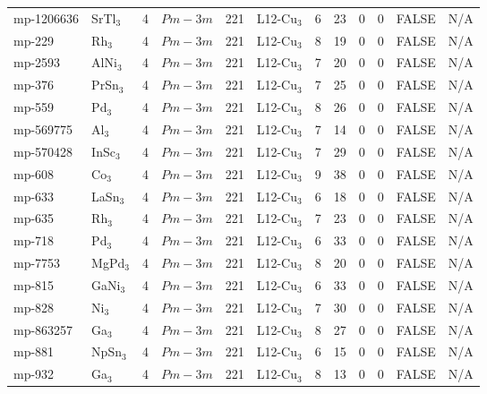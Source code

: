 {\begin{longtable}{llcccccccccc}
    mp-1206636 & SrTl$_{3}$ & 4     & $Pm-3m$ & 221   & L12-Cu$_{3}$ & 6     & 23    & 0     & 0     & FALSE & N/A \\
    mp-229 & Rh$_{3}$ & 4     & $Pm-3m$ & 221   & L12-Cu$_{3}$ & 8     & 19    & 0     & 0     & FALSE & N/A \\
    mp-2593 & AlNi$_{3}$ & 4     & $Pm-3m$ & 221   & L12-Cu$_{3}$ & 7     & 20    & 0     & 0     & FALSE & N/A \\
    mp-376 & PrSn$_{3}$ & 4     & $Pm-3m$ & 221   & L12-Cu$_{3}$ & 7     & 25    & 0     & 0     & FALSE & N/A \\
    mp-559 & Pd$_{3}$ & 4     & $Pm-3m$ & 221   & L12-Cu$_{3}$ & 8     & 26    & 0     & 0     & FALSE & N/A \\
    mp-569775 & Al$_{3}$ & 4     & $Pm-3m$ & 221   & L12-Cu$_{3}$ & 7     & 14    & 0     & 0     & FALSE & N/A \\
    mp-570428 & InSc$_{3}$ & 4     & $Pm-3m$ & 221   & L12-Cu$_{3}$ & 7     & 29    & 0     & 0     & FALSE & N/A \\
    mp-608 & Co$_{3}$ & 4     & $Pm-3m$ & 221   & L12-Cu$_{3}$ & 9     & 38    & 0     & 0     & FALSE & N/A \\
    mp-633 & LaSn$_{3}$ & 4     & $Pm-3m$ & 221   & L12-Cu$_{3}$ & 6     & 18    & 0     & 0     & FALSE & N/A \\
    mp-635 & Rh$_{3}$ & 4     & $Pm-3m$ & 221   & L12-Cu$_{3}$ & 7     & 23    & 0     & 0     & FALSE & N/A \\
    mp-718 & Pd$_{3}$ & 4     & $Pm-3m$ & 221   & L12-Cu$_{3}$ & 6     & 33    & 0     & 0     & FALSE & N/A \\
    mp-7753 & MgPd$_{3}$ & 4     & $Pm-3m$ & 221   & L12-Cu$_{3}$ & 8     & 20    & 0     & 0     & FALSE & N/A \\
    mp-815 & GaNi$_{3}$ & 4     & $Pm-3m$ & 221   & L12-Cu$_{3}$ & 6     & 33    & 0     & 0     & FALSE & N/A \\
    mp-828 & Ni$_{3}$ & 4     & $Pm-3m$ & 221   & L12-Cu$_{3}$ & 7     & 30    & 0     & 0     & FALSE & N/A \\
    mp-863257 & Ga$_{3}$ & 4     & $Pm-3m$ & 221   & L12-Cu$_{3}$ & 8     & 27    & 0     & 0     & FALSE & N/A \\
    mp-881 & NpSn$_{3}$ & 4     & $Pm-3m$ & 221   & L12-Cu$_{3}$ & 6     & 15    & 0     & 0     & FALSE & N/A \\
    mp-932 & Ga$_{3}$ & 4     & $Pm-3m$ & 221   & L12-Cu$_{3}$ & 8     & 13    & 0     & 0     & FALSE & N/A \\

\end{longtable}}
